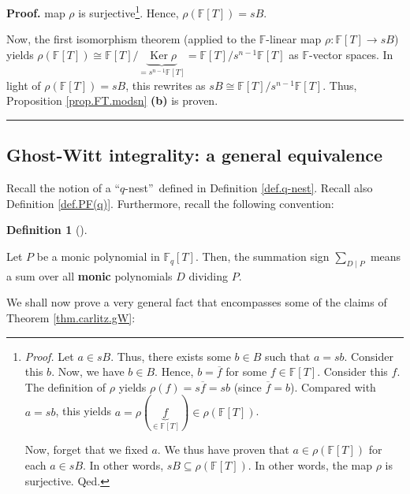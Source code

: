 \documentclass[numbers=enddot,12pt,final,onecolumn,notitlepage]{scrartcl}%
\theoremstyle{definition}
\newtheorem{defi}[theo]{Definition}
\newenvironment{definition}[1][]
{\begin{defi}[#1]\begin{leftbar}}
{\end{leftbar}\end{defi}}
\newenvironment{proof}[1][Proof]{\noindent\textbf{#1.} }{\ \rule{0.5em}{0.5em}}
\let\sumnonlimits\sum
\renewcommand{\sum}{\sumnonlimits\limits}
\begin{document}
\begin{proof}
map $\rho$ is surjective\footnote{\textit{Proof.} Let $a\in sB$. Thus, there
exists some $b\in B$ such that $a=sb$. Consider this $b$. Now, we have $b\in
B$. Hence, $b=\overline{f}$ for some $f\in\mathbb{F}\left[  T\right]  $.
Consider this $f$. The definition of $\rho$ yields $\rho\left(  f\right)
=s\overline{f}=sb$ (since $\overline{f}=b$). Compared with $a=sb$, this yields
$a=\rho\left(  \underbrace{f}_{\in\mathbb{F}\left[  T\right]  }\right)
\in\rho\left(  \mathbb{F}\left[  T\right]  \right)  $.
\par
Now, forget that we fixed $a$. We thus have proven that $a\in\rho\left(
\mathbb{F}\left[  T\right]  \right)  $ for each $a\in sB$. In other words,
$sB\subseteq\rho\left(  \mathbb{F}\left[  T\right]  \right)  $. In other
words, the map $\rho$ is surjective. Qed.}. Hence, $\rho\left(  \mathbb{F}%
\left[  T\right]  \right)  =sB$.

Now, the first isomorphism theorem (applied to the $\mathbb{F}$-linear map
$\rho:\mathbb{F}\left[  T\right]  \rightarrow sB$) yields $\rho\left(
\mathbb{F}\left[  T\right]  \right)  \cong\mathbb{F}\left[  T\right]
/\underbrace{\operatorname*{Ker}\rho}_{=s^{n-1}\mathbb{F}\left[  T\right]
}=\mathbb{F}\left[  T\right]  /s^{n-1}\mathbb{F}\left[  T\right]  $ as
$\mathbb{F}$-vector spaces. In light of $\rho\left(  \mathbb{F}\left[
T\right]  \right)  =sB$, this rewrites as $sB\cong\mathbb{F}\left[  T\right]
/s^{n-1}\mathbb{F}\left[  T\right]  $. Thus, Proposition \ref{prop.FT.modsn}
\textbf{(b)} is proven.
\end{proof}

\subsection{Ghost-Witt integrality: a general equivalence}

Recall the notion of a \textquotedblleft$q$-nest\textquotedblright\ defined in
Definition \ref{def.q-nest}. Recall also Definition \ref{def.PF(q)}.
Furthermore, recall the following convention:

\begin{definition}
Let $P$ be a monic polynomial in $\mathbb{F}_{q}\left[  T\right]  $. Then, the
summation sign $\sum_{D\mid P}$ means a sum over all \textbf{monic}
polynomials $D$ dividing $P$.
\end{definition}

We shall now prove a very general fact that encompasses some of the claims of
Theorem \ref{thm.carlitz.gW}:
\end{document}
